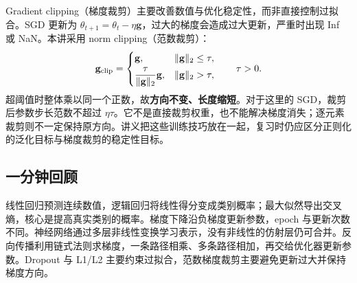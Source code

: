 Gradient clipping（梯度裁剪）主要改善数值与优化稳定性，而非直接控制过拟合。SGD 更新为 $\theta_{t+1}=\theta_t-\eta\mathbf g$，过大的梯度会造成过大更新，严重时出现 Inf 或 NaN。本讲采用 norm clipping（范数裁剪）：
\[
  \mathbf g_{\rm clip}=
  \begin{cases}
    \mathbf g,&\|\mathbf g\|_2\le\tau,\\[2pt]
    \displaystyle\frac{\tau}{\|\mathbf g\|_2}\mathbf g,
       &\|\mathbf g\|_2>\tau,
  \end{cases}
  \qquad \tau>0.
\]
超阈值时整体乘以同一个正数，故\textbf{方向不变、长度缩短}。对于这里的 SGD，裁剪后参数步长范数不超过 $\eta\tau$。它不是直接裁剪权重，也不能解决梯度消失；逐元素裁剪则不一定保持原方向。讲义把这些训练技巧放在一起，复习时仍应区分正则化的泛化目标与梯度裁剪的稳定性目标。

\subsection{一分钟回顾}

线性回归预测连续数值，逻辑回归将线性得分变成类别概率；最大似然导出交叉熵，核心是提高真实类别的概率。梯度下降沿负梯度更新参数，epoch 与更新次数不同。神经网络通过多层非线性变换学习表示，没有非线性的仿射层仍可合并。反向传播利用链式法则求梯度，一条路径相乘、多条路径相加，再交给优化器更新参数。Dropout 与 L1/L2 主要约束过拟合，范数梯度裁剪主要避免更新过大并保持梯度方向。
